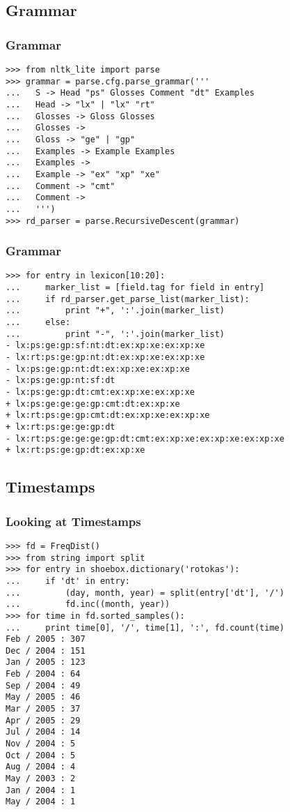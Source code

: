 \documentclass{beamer}             %
\begin{document}
\subsection{Grammar}

\begin{frame}[fragile]
\frametitle{Grammar}
\small

\begin{verbatim}
>>> from nltk_lite import parse
>>> grammar = parse.cfg.parse_grammar('''
...   S -> Head "ps" Glosses Comment "dt" Examples
...   Head -> "lx" | "lx" "rt"
...   Glosses -> Gloss Glosses
...   Glosses ->
...   Gloss -> "ge" | "gp"
...   Examples -> Example Examples
...   Examples ->
...   Example -> "ex" "xp" "xe"
...   Comment -> "cmt"
...   Comment ->
...   ''')
>>> rd_parser = parse.RecursiveDescent(grammar)
\end{verbatim}
\end{frame}

\begin{frame}[fragile]
\frametitle{Grammar}
\small

\begin{verbatim}
>>> for entry in lexicon[10:20]:
...     marker_list = [field.tag for field in entry]
...     if rd_parser.get_parse_list(marker_list):
...         print "+", ':'.join(marker_list)
...     else:
...         print "-", ':'.join(marker_list)
- lx:ps:ge:gp:sf:nt:dt:ex:xp:xe:ex:xp:xe
- lx:rt:ps:ge:gp:nt:dt:ex:xp:xe:ex:xp:xe
- lx:ps:ge:gp:nt:dt:ex:xp:xe:ex:xp:xe
- lx:ps:ge:gp:nt:sf:dt
- lx:ps:ge:gp:dt:cmt:ex:xp:xe:ex:xp:xe
+ lx:ps:ge:ge:ge:gp:cmt:dt:ex:xp:xe
+ lx:rt:ps:ge:gp:cmt:dt:ex:xp:xe:ex:xp:xe
+ lx:rt:ps:ge:ge:gp:dt
- lx:rt:ps:ge:ge:ge:gp:dt:cmt:ex:xp:xe:ex:xp:xe:ex:xp:xe
+ lx:rt:ps:ge:gp:dt:ex:xp:xe
\end{verbatim}
\end{frame}



\subsection{Timestamps}

\begin{frame}[fragile]
\frametitle{Looking at Timestamps}
\scriptsize
\begin{verbatim}
>>> fd = FreqDist()
>>> from string import split
>>> for entry in shoebox.dictionary('rotokas'):
...     if 'dt' in entry:
...         (day, month, year) = split(entry['dt'], '/')
...         fd.inc((month, year))
>>> for time in fd.sorted_samples():
...     print time[0], '/', time[1], ':', fd.count(time)
Feb / 2005 : 307
Dec / 2004 : 151
Jan / 2005 : 123
Feb / 2004 : 64
Sep / 2004 : 49
May / 2005 : 46
Mar / 2005 : 37
Apr / 2005 : 29
Jul / 2004 : 14
Nov / 2004 : 5
Oct / 2004 : 5
Aug / 2004 : 4
May / 2003 : 2
Jan / 2004 : 1
May / 2004 : 1
\end{verbatim}
\end{frame}
\end{document}
